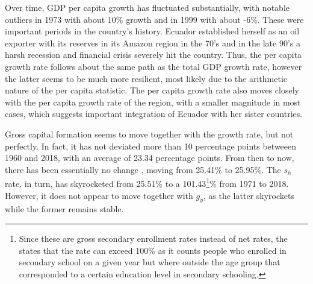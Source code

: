 \documentclass[12pt,twoside,a4paper]{article}
\numberwithin{equation}{section}
\begin{document}
Over time, GDP per capita growth has fluctuated substantially, with notable outliers in 1973 with about 10\% growth and in 1999 with about -6\%. These were important periods in the country's history. Ecuador established herself as an oil exporter with its reserves in its Amazon region in the 70's \parencite{.2012} and in the late 90's a harsh recession and financial crisis severely hit the country\parencite{.2014}. Thus, the per capita growth rate follows about the same path as the total GDP growth rate, however the latter seems to be much more resilient, most likely due to the arithmetic nature of the per capita statistic. The per capita growth rate also moves closely with the per capita growth rate of the region, with a smaller magnitude in most cases, which suggests important integration of Ecuador with her sister countries. 

 Gross capital formation seems to move together with the growth rate, but not perfectly. In fact, it has not deviated more than 10 percentage points betweeen 1960 and 2018, with an average of 23.34 percentage points. From then to now, there has been essentially no change , moving from 25.41\% to 25.95\%. The $s_h$ rate, in turn, has skyrocketed from 25.51\% to a 101.43\footnote{Since these are gross secondary enrollment rates instead of net rates, the \textcite{WorldBankGroup.} states that the rate can exceed 100\% as it counts people who enrolled in secondary school on a given year but where outside the age group that corresponded to a certain education level in secondary schooling.}\%  from 1971 to 2018. However, it does not appear to move together with $g_y$, as the latter skyrockets while the former remains stable. 
\end{document}
